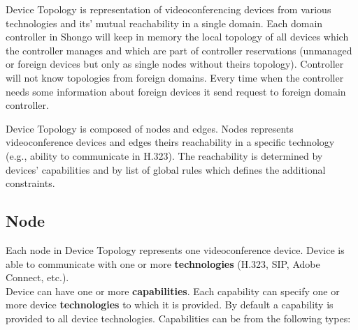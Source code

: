 Device Topology is representation of videoconferencing devices from various 
technologies and its' mutual reachability in a single domain. Each domain 
controller in Shongo will keep in memory the local topology of all devices 
which the controller manages and which are part of controller reservations 
(unmanaged or foreign devices but only as single nodes without theirs 
topology).
Controller will not know topologies from foreign domains. Every time when the 
controller needs some information about foreign devices it send request to 
foreign domain controller.

Device Topology is composed of nodes and edges. Nodes represents 
videoconference devices and edges theirs reachability in a specific technology 
(e.g., ability to communicate in H.323). The reachability is determined by 
devices' capabilities and by list of global rules which defines the additional 
constraints.

\subsection{Node}

Each node in Device Topology represents one videoconference device. Device is 
able to communicate with one or more \textbf{technologies} (H.323, SIP, Adobe 
Connect, etc.).
\\
Device can have one or more \textbf{capabilities}. Each capability can specify 
one or more device \textbf{technologies} to which it is provided. By default a capability is provided to all device technologies. Capabilities 
can be from the following types:

